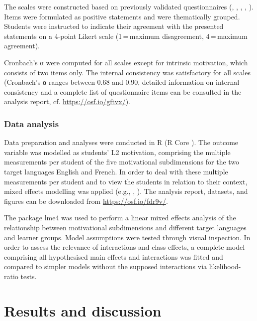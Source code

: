 \documentclass[output=paper]{langsci/langscibook}
\begin{document}
\begin{sloppypar}
The scales were constructed based on previously validated questionnaires (\citealt{HorwitzEtAl1986}, \citealt{Stoeckli2004}, \citealt{Doernyei2010}, \citealt{Heinzmann2013}, \citealt{PeyerEtAl2016}). Items were formulated as positive statements and were thematically grouped. Students were instructed to indicate their agreement with the presented statements on a 4-point Likert scale (1\,=\,maximum disagreement, 4\,=\,maximum agreement). 
\end{sloppypar}

Cronbach’s α were computed for all scales except for intrinsic motivation, which consists of two items only. The internal consistency was satisfactory for all scales (Cronbach’s α ranges between 0.68 and 0.90, detailed information on internal consistency and a complete list of questionnaire items can be consulted in the analysis report, cf. \url{https://osf.io/gftvx/}).


\subsubsection{Data analysis}


Data preparation and analyses were conducted in R (R Core \citealt{Team2019}). The outcome variable was modelled as students’ L2 motivation, comprising the multiple measurements per student of the five motivational subdimensions for the two target languages English and French. In order to deal with these multiple measurements per student and to view the students in relation to their context, mixed effects modelling was applied (e.g., \citealt{BaayenEtAl2008}, \citealt{PfenningerSingleton2016}). The analysis report, datasets, and figures can be downloaded from \url{https://osf.io/fdr9v/}.

The package lme4 \citep{BatesEtAl2015} was used to perform a linear mixed effects analysis of the relationship between motivational subdimensions and different target languages and learner groups. Model assumptions were tested through visual inspection. In order to assess the relevance of interactions and class effects, a complete model comprising all hypothesised main effects and interactions was fitted and compared to simpler models without the supposed interactions via likelihood-ratio tests. 

\section{Results and discussion}
\end{document}
